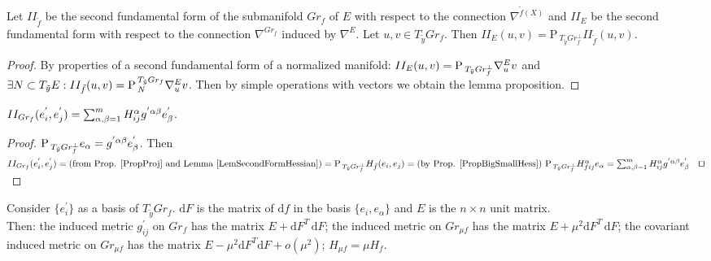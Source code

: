\documentclass{llncs}
\newcommand{\Proj}{\mathrm{P}{\,}}
\newcommand{\ProjNonOrth}[2]{\tensor*{\Proj}{^{#1}_{#2}}}
\newcommand{\CovariantDiffManif}[1]{\nabla^{#1}}
\newcommand{\CovariantDerivManif}[2]{\tensor*{\nabla}{^{#1}_{#2}}}
\newcommand{\Diff}{\mathrm{d}}
\begin{document}
\begin{proposition} \label{PropProj}
Let $II_{\tilde{f}}$ be the second fundamental form of the submanifold $Gr_f$ of $E$ with respect to the connection $\CovariantDiffManif{\tilde{f}(X)}$ and $II_E$ be the second fundamental form with respect to the connection $\CovariantDiffManif{Gr_f}$ induced by $\CovariantDiffManif{E}$. 
Let $u, v \in T_{\tilde{y}}Gr_f$. Then $II_E(u, v) = \Proj_{T_{\tilde{y}}Gr_f^{\bot}} II_{\tilde{f}}(u, v)$.
\end{proposition}

\begin{proof}
By properties of a second fundamental form of a normalized manifold: 
$II_{E}(u, v) = \Proj_{T_{\tilde{y}}Gr_f^{\bot}}\CovariantDerivManif{E}{u}v$ and $\exists N \subset T_{\tilde{y}}E: 
II_{\tilde{f}}(u, v) = \ProjNonOrth{T_{\tilde{y}}Gr_f}{N}\CovariantDerivManif{E}{u}v$.
Then by simple operations with vectors we obtain the lemma proposition.
\end{proof}

\begin{lemma} \label{LemSecondHessianFormula}
$II_{Gr_f}(e_i^{'}, e_j^{'})=\sum_{\alpha, \beta=1}^{m} \tensor*{H}{^{\alpha}_i_j} \tensor*{g}{^{'}^{\alpha}^{\beta}} e_{\beta}^{'}$.
\end{lemma}

\begin{proof}
$\Proj_{T_{\tilde{y}}Gr_f^{\bot}}e_{\alpha} = \tensor*{g}{^{'}^{\alpha}^{\beta}} e_{\beta}^{'}$. Then 
$
II_{Gr_f}(e_i^{'}, e_j^{'}) = \textrm{(from Prop. \ref{PropProj} and Lemma \ref{LemSecondFormHessian})} 
\\
=\Proj_{T_{\tilde{y}}Gr_f^{\bot}} H_{\tilde{f}}(e_i, e_j)
=\textrm{(by Prop. \ref{PropBigSmallHess}) } \Proj_{T_{\tilde{y}}Gr_f^{\bot}} \tensor*{H}{^{\alpha}_f_i_j}e_{\alpha} 
= \sum_{\alpha, \beta=1}^{m} \tensor*{H}{^{\alpha}_i_j} \tensor*{g}{^{'}^{\alpha}^{\beta}} e_{\beta}^{'}
\textrm{\qed}
$
\end{proof}

\begin{proposition} \label{PropScaled}
Consider $\{ e_i^{'} \}$ as a basis of $T_{\tilde{y}}Gr_f$. 
$\Diff F$ is the matrix of $\Diff f$ in the basis $\{ e_i, e_{\alpha} \}$ and $E$ is the $n\times n$ unit matrix.
\\
Then:
the induced metric $g^{'}_{ij}$ on $Gr_f$ has the matrix $E + \Diff F^{T} \, \Diff F $;
the induced metric on $Gr_{\mu f}$ has the matrix $E + \mu^{2} \Diff F^{T} \, \Diff F$;
the covariant induced metric on $Gr_{\mu f}$ has the matrix $E - \mu^{2} \Diff F^{T} \Diff F + o(\mu ^ {2})$;
$H_{\mu f} = \mu H_f.$
\end{proposition}
\end{document}
